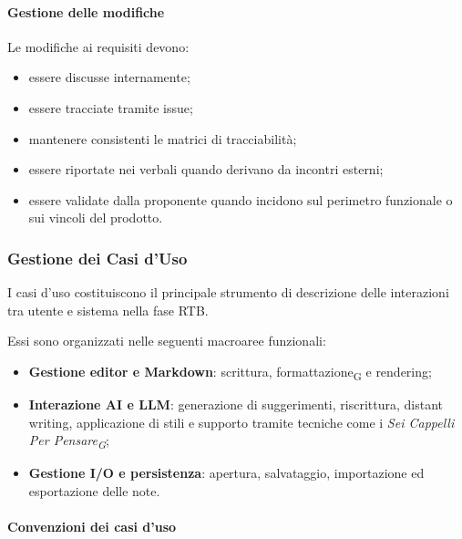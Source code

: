 \paragraph{Gestione delle modifiche}

Le modifiche ai requisiti devono:

\begin{itemize}
    \item essere discusse internamente;
    \item essere tracciate tramite issue;
    \item mantenere consistenti le matrici di tracciabilità;
    \item essere riportate nei verbali quando derivano da incontri esterni;
    \item essere validate dalla proponente quando incidono sul perimetro funzionale
    o sui vincoli del prodotto.
\end{itemize}


\subsubsection{Gestione dei Casi d'Uso}

I casi d'uso costituiscono il principale strumento di descrizione delle interazioni
tra utente e sistema nella fase RTB.

Essi sono organizzati nelle seguenti macroaree funzionali:

\begin{itemize}
    \item \textbf{Gestione editor e Markdown}: scrittura, formattazione\textsubscript{G} e rendering;

    \item \textbf{Interazione AI e LLM}: generazione di suggerimenti, riscrittura,
    distant writing, applicazione di stili e supporto tramite tecniche come i
    \textit{Sei Cappelli Per Pensare\textsubscript{G}};

    \item \textbf{Gestione I/O e persistenza}: apertura, salvataggio, importazione ed
    esportazione delle note.
\end{itemize}

\paragraph{Convenzioni dei casi d'uso}


